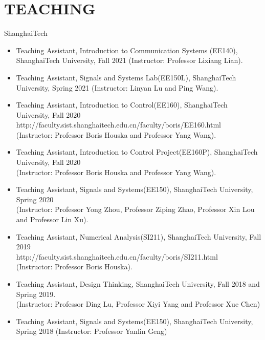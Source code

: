 \documentclass[paper=a4,fontsize=11pt]{scrartcl} %
\newlength{\spacebox}
\newcommand{\NewPart}[1]{\section*{\uppercase{#1}}}
\newcommand{\PersonalEntry}[2]{
		\noindent\hangindent=2em\hangafter=0 %
		\parbox{\spacebox}{        %
		\textit{#1}}		       %
		\hspace{1.5em} #2 \par}    %
\newcommand{\SkillsEntry}[2]{      %
		\noindent\hangindent=2em\hangafter=0 %
		\parbox{\spacebox}{        %
		\textit{#1}}			   %
		\hspace{1.5em} #2 \par}    %
\begin{document}
\NewPart{Teaching}{ShanghaiTech}
\begin{itemize}
	
	
	\item{Teaching Assistant, 	Introduction to Communication Systems (EE140), ShanghaiTech University, Fall 2021 (Instructor: Professor Lixiang Lian).}
	
	\item{Teaching Assistant, Signals and Systems Lab(EE150L), ShanghaiTech University, Spring 2021 (Instructor: Linyan Lu and Ping Wang).}
	
	\item{Teaching Assistant, Introduction to Control(EE160), ShanghaiTech University, Fall 2020\\ 
		http://faculty.sist.shanghaitech.edu.cn/faculty/boris/EE160.html\\
		(Instructor: Professor Boris Houska and Professor Yang Wang).
	}
	
	\item{Teaching Assistant, Introduction to Control Project(EE160P), ShanghaiTech University, Fall 2020\\ (Instructor: Professor Boris Houska and Professor Yang Wang).}
	
	\item{Teaching Assistant, Signals and Systems(EE150),  ShanghaiTech University, Spring 2020 \\ (Instructor: Professor Yong Zhou, Professor Ziping Zhao, Professor Xin Lou and Professor Lin Xu).}
	
	\item{Teaching Assistant, Numerical Analysis(SI211), ShanghaiTech University, Fall 2019\\ 
		{http://faculty.sist.shanghaitech.edu.cn/faculty/boris/SI211.html}\\
		(Instructor: Professor Boris Houska).
	}
	
	\item{Teaching Assistant, Design Thinking, ShanghaiTech University, Fall 2018 and Spring 2019.\\ (Instructor: Professor Ding Lu, Professor Xiyi Yang and Professor Xue Chen) }
	
	\item{Teaching Assistant, Signals and Systems(EE150),  ShanghaiTech University, Spring 2018 (Instructor: Professor Yanlin Geng)
		
		}


	
\end{itemize}




\end{document}
